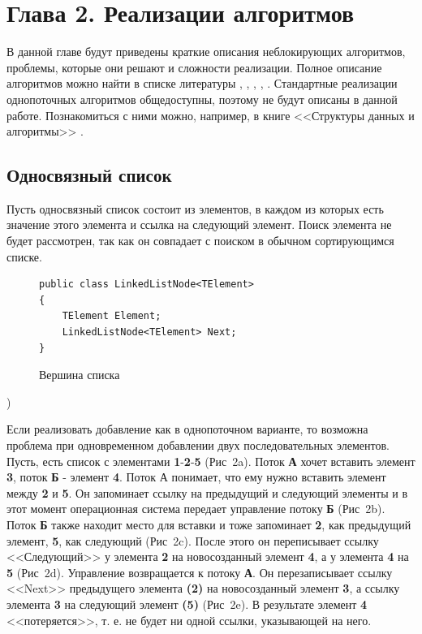 \documentclass[12pt]{article}
\begin{document}
{		\newpage
		
		\section{Глава 2. Реализации алгоритмов}
			\par В данной главе будут приведены краткие описания неблокирующих алгоритмов, проблемы, которые они решают и сложности реализации. Полное описание алгоритмов можно найти в списке литературы \cite{LinkedList}, \cite{ListSkipList}, \cite{ListAndSkipList}, \cite{HashTable}, \cite{artOfMultiprocessor}. Стандартные реализации однопоточных алгоритмов общедоступны, поэтому не будут описаны в данной работе. Познакомиться с ними можно, например, в книге <<Структуры данных и алгоритмы>> \cite{dataStructures}.
			\subsection{Односвязный список}
				\par Пусть односвязный список состоит из элементов, в каждом из которых есть значение этого элемента и ссылка на следующий элемент. Поиск элемента не будет рассмотрен, так как он совпадает с поиском в обычном сортирующимся списке.
				\begin{figure}[h]
				\begin{lstlisting}
public class LinkedListNode<TElement>
{
	TElement Element;
	LinkedListNode<TElement> Next;
}
				\end{lstlisting}
				\caption{Вершина списка}
				\end{figure})
				\par Если реализовать добавление как в однопоточном варианте, то возможна проблема при одновременном добавлении двух последовательных элементов. Пусть, есть список с элементами \textbf{1}-\textbf{2}-\textbf{5} (Рис~2a). Поток \textbf{А} хочет вставить элемент \textbf{3}, поток \textbf{Б} - элемент \textbf{4}. Поток А понимает, что ему нужно вставить элемент между \textbf{2} и \textbf{5}. Он запоминает ссылку на предыдущий и следующий элементы и в этот момент операционная система передает управление потоку \textbf{Б} (Рис~2b). Поток \textbf{Б} также находит место для вставки и тоже запоминает \textbf{2}, как предыдущий элемент, \textbf{5}, как следующий (Рис~2c). После этого он переписывает ссылку <<Следующий>> у элемента \textbf{2} на новосозданный элемент \textbf{4}, а у элемента \textbf{4} на \textbf{5} (Рис~2d). Управление возвращается к потоку \textbf{А}. Он перезаписывает ссылку <<Next>> предыдущего элемента \textbf{(2)} на новосозданный элемент \textbf{3}, а ссылку элемента \textbf{3} на следующий элемент \textbf{(5)} (Рис~2e). В результате элемент \textbf{4} <<потеряется>>, т. е. не будет ни одной ссылки, указывающей на него.
}
\end{document}
